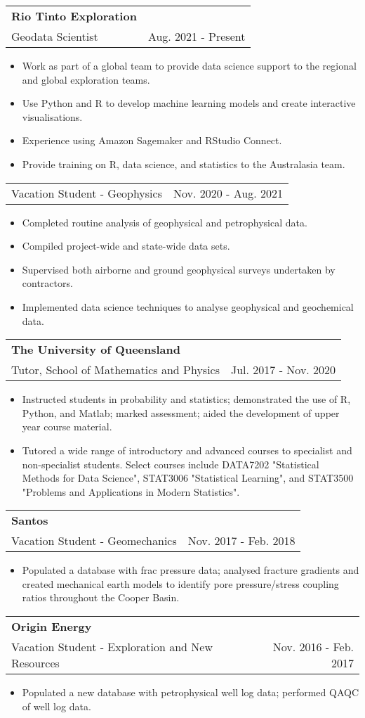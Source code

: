 \documentclass[letterpaper,11pt]{article}
\makeatletter
\newcommand{\resumeItem}[2]{
  \item\small{
    \textbf{#1}{#2 \vspace{-2pt}}
  }
}
\newcommand{\resumeSubheading}[4]{
  \vspace{-1pt}\item
    \begin{tabular*}{0.97\textwidth}[t]{l@{\extracolsep{\fill}}r}
      \textbf{#1} & #2 \\
      {\small #3} & {\small #4} \\
    \end{tabular*}\vspace{-5pt}
}
\newcommand{\resumeSubSubheading}[2]{
    \begin{tabular*}{0.97\textwidth}{l@{\extracolsep{\fill}}r}
      {\small#1} & {\small #2} \\
    \end{tabular*}\vspace{-5pt}
}
\newcommand{\resumeItemListStart}{\begin{itemize}}
\newcommand{\resumeItemListEnd}{\end{itemize}\vspace{-5pt}}
\makeatother
\begin{document}
    \resumeSubheading
      {Rio Tinto Exploration}{}
      {Geodata Scientist}{Aug. 2021 - Present}
      \resumeItemListStart
        \resumeItem{}
          {Work as part of a global team to provide data science support to the regional and global exploration teams.}
        \resumeItem{}
          {Use Python and R to develop machine learning models and create interactive visualisations.}
        \resumeItem{}
          {Experience using Amazon Sagemaker and RStudio Connect.}
        \resumeItem{}
          {Provide training on R, data science, and statistics to the Australasia team.}
      \resumeItemListEnd
    \resumeSubSubheading
     {Vacation Student - Geophysics}{Nov. 2020 - Aug. 2021}
     \resumeItemListStart
        \resumeItem{}
          {Completed routine analysis of geophysical and petrophysical data.}
        \resumeItem{}
          {Compiled project-wide and state-wide data sets.}
        \resumeItem{}
          {Supervised both airborne and ground geophysical surveys undertaken by contractors.}
        \resumeItem{}
          {Implemented data science techniques to analyse geophysical and geochemical data.}
     \resumeItemListEnd

    \resumeSubheading
      {The University of Queensland}{}
      {Tutor, School of Mathematics and Physics}{Jul. 2017 - Nov. 2020}
      \resumeItemListStart
        \resumeItem{}
          {Instructed students in probability and statistics; demonstrated the use of R, Python, and Matlab; marked assessment; aided the development of upper year course material.} 
        \resumeItem{}
          {Tutored a wide range of introductory and advanced courses to specialist and non-specialist students. Select courses include DATA7202 "Statistical Methods for Data Science", STAT3006 "Statistical Learning", and STAT3500 "Problems and Applications in Modern Statistics".}
      \resumeItemListEnd

    \resumeSubheading
      {Santos}{}
      {Vacation Student - Geomechanics}{Nov. 2017 - Feb. 2018}
      \resumeItemListStart
        \resumeItem{}
          {Populated a database with frac pressure data; analysed fracture gradients and created mechanical earth models to identify pore pressure/stress coupling ratios throughout the Cooper Basin.}
      \resumeItemListEnd

    \resumeSubheading
      {Origin Energy}{}
      {Vacation Student - Exploration and New Resources}{Nov. 2016 - Feb. 2017}
      \resumeItemListStart
        \resumeItem{}
          {Populated a new database with petrophysical well log data; performed QAQC of well log data.}
      \resumeItemListEnd
\end{document}

